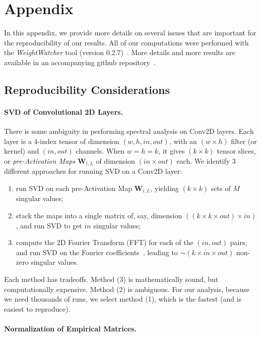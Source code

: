 \section{Appendix}
\label{sxn:appendix}


In this appendix, we provide more details on several issues that are important for the reproducibility of our results.
All of our computations were performed with the \emph{WeightWatcher} tool (version 0.2.7)~\cite{weightwatcher_package}.
More details and more results are available in an accompanying github repository~\cite{kdd20_sub_repo}.


\subsection{Reproducibility Considerations}


\paragraph{SVD of Convolutional 2D Layers.}

There is some ambiguity in performing spectral analysis on Conv2D layers.  
Each layer is a 4-index tensor of dimension $(w,h,in,out)$, with an $(w\times h)$ filter (or kernel) and $(in, out)$
channels. When $w=h=k$, it gives $(k\times k)$ tensor slices, or \emph{pre-Activation Maps} $\mathbf{W}_{i,L}$ of dimension $(in\times out)$ each. 
We identify 3 different approaches for running SVD on a Conv2D layer:
\begin{enumerate}
\item run SVD on each pre-Activation Map $\mathbf{W}_{i,L}$, yielding $(k\times k)$ sets of $M$ singular values;
\item stack the maps into a single matrix of, say, dimension $((k\times k\times out)\times in)$, and run SVD to get $in$ singular values;
\item compute the 2D Fourier Transform (FFT) for each of the $(in, out)$ pairs, and run SVD on the Fourier coefficients~\cite{CNNSVD}, leading to $\sim(k\times in\times out)$ non-zero singular values.
\end{enumerate}
Each method has tradeoffs.  
Method (3) is mathematically sound, but computationally expensive. Method (2) is ambiguous.
For our analysis, because we need thousands of runs, we select method (1), which is the fastest (and is easiest to reproduce).


\paragraph{Normalization of Empirical Matrices.}  

